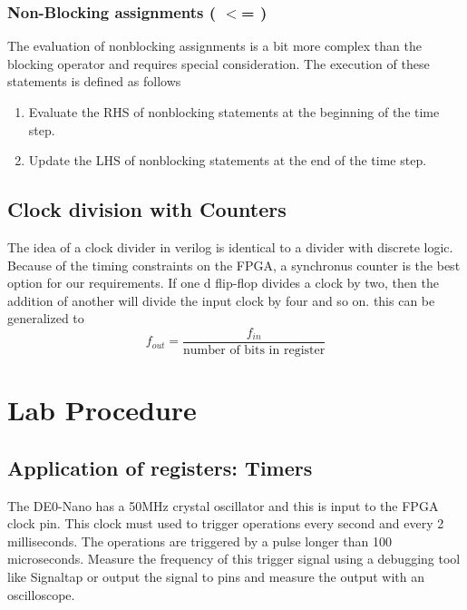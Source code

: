     \subsubsection{Non-Blocking assignments \bfseries ( $<$= )} 
      The evaluation of nonblocking assignments is a bit more complex than the blocking operator and requires special consideration. The execution of these statements is defined as follows
      \begin{enumerate}
        \item Evaluate the RHS of nonblocking statements at the beginning of the time step.
        \item Update the LHS of nonblocking statements at the end of the time step.
      \end{enumerate}
      \cite{Sunburst:BlockNoBlock}

  \subsection{Clock division with Counters}
    The idea of a clock divider in verilog is identical to a divider with discrete logic. Because of the timing constraints on the FPGA, a synchronus counter is the best option for our requirements. If one d flip-flop divides a clock by two, then the addition of another will divide the input clock by four and so on. this can be generalized to $$f_{out}=\frac{f_{in}}{\text{number of bits in register}}$$
    
\section{Lab Procedure}

  \subsection{Application of registers: Timers}
      The DE0-Nano has a 50MHz crystal oscillator and this is input to the FPGA clock pin.  This clock must used to trigger operations every second and every 2 milliseconds. The operations are triggered by a pulse longer than 100 microseconds. Measure the frequency  of this trigger signal using a debugging tool like Signaltap or output the signal to pins and measure the output with an oscilloscope.
     
